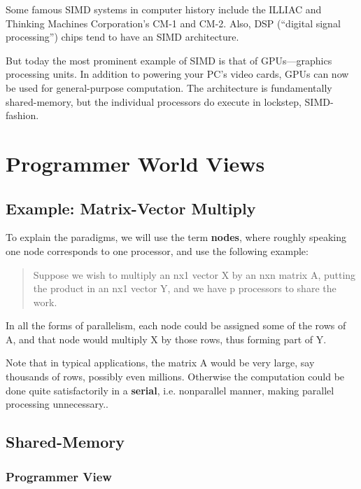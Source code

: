 Some famous SIMD systems in computer history include the ILLIAC and
Thinking Machines Corporation's CM-1 and CM-2.  Also, DSP (``digital
signal processing'') chips tend to have an SIMD architecture.

But today the most prominent example of SIMD is that of GPUs---graphics
processing units.  In addition to powering your PC's video cards, GPUs
can now be used for general-purpose computation.  The architecture is
fundamentally shared-memory, but the individual processors do execute in
lockstep, SIMD-fashion.

\section{Programmer World Views}

\subsection{Example:  Matrix-Vector Multiply}
\label{matvec}

To explain the paradigms, we will use the term \textbf{nodes}, where
roughly speaking one node corresponds to one processor, and use the
following example:

\begin{quote}

Suppose we wish to multiply an nx1 vector X by an nxn matrix A, putting
the product in an nx1 vector Y, and we have p processors to share the
work.

\end{quote}

In all the forms of parallelism, each node could be assigned some of the
rows of A, and that node would multiply X by those rows, thus forming
part of Y.

Note that in typical applications, the matrix A would be very large, say
thousands of rows, possibly even millions.  Otherwise the computation
could be done quite satisfactorily in a {\bf serial}, i.e.
nonparallel manner, making parallel processing unnecessary..

\subsection{Shared-Memory}

\subsubsection{Programmer View}
\label{sharedview}

